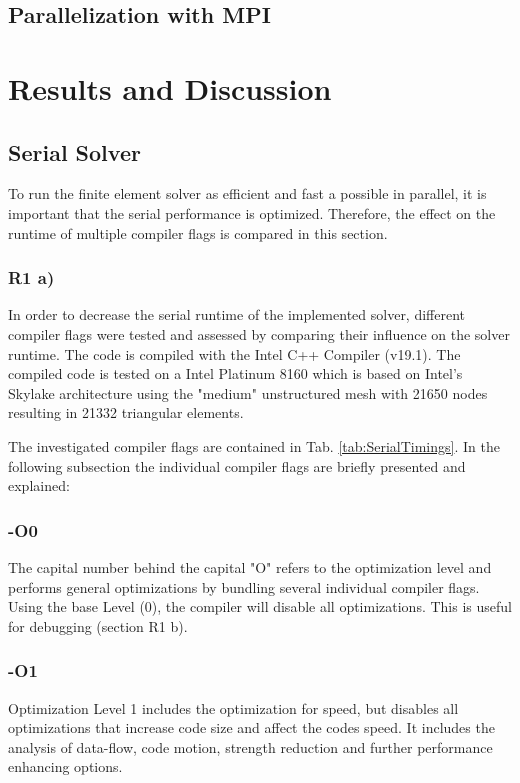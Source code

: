 \documentclass[a4paper, 11pt, oneside]{scrartcl}
\newcommand{\refTab}[1]{Tab. \ref{#1}}
\begin{document}
\subsection{Parallelization with MPI}

\section{Results and Discussion}


\subsection{Serial Solver \label{sec:Serial}}

To run the finite element solver as efficient and fast a possible in parallel, it is important that the serial performance is optimized. Therefore, the effect on the runtime of multiple compiler flags is compared in this section.

\subsubsection{R1 a)}
In order to decrease the serial runtime of the implemented solver, different compiler flags were tested and assessed by comparing their influence on the solver runtime. The code is compiled with the Intel C++ Compiler (v19.1). The compiled code is tested on a Intel Platinum 8160 which is based on Intel's Skylake architecture using the "medium" unstructured mesh with 21650 nodes resulting in 21332 triangular elements.

The investigated compiler flags are contained in \refTab{tab:SerialTimings}.
In the following subsection the individual compiler flags are briefly presented and explained: 
 
\subsubsection*{-O0}
The capital number behind the capital "O" refers to the optimization level and performs general optimizations by bundling several individual compiler flags. Using the base Level (0),  the compiler will disable all optimizations. This is useful for debugging (section R1 b).

\subsubsection*{-O1}
Optimization Level 1 includes the optimization for speed, but disables all optimizations that increase code size and affect the codes speed. It includes the analysis of data-flow, code motion, strength reduction and further performance enhancing options.
\end{document}
